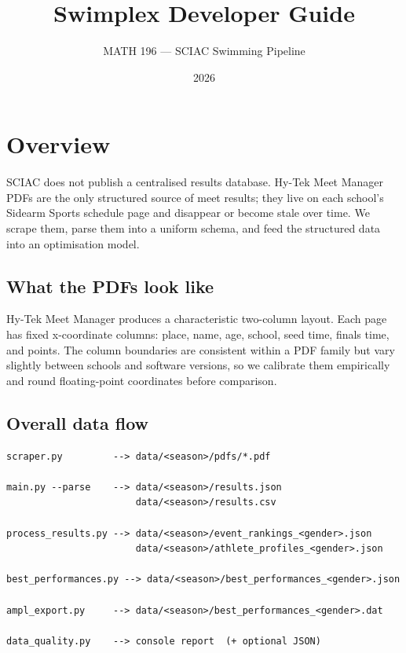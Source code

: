 \documentclass{article}
\title{Swimplex Developer Guide}
\author{MATH 196 --- SCIAC Swimming Pipeline}
\date{2026}
\begin{document}
\maketitle
\tableofcontents
\newpage

\section{Overview}

SCIAC does not publish a centralised results database. Hy-Tek Meet Manager
PDFs are the only structured source of meet results; they live on each school's
Sidearm Sports schedule page and disappear or become stale over time. We scrape
them, parse them into a uniform schema, and feed the structured data into an
optimisation model.

\subsection*{What the PDFs look like}

Hy-Tek Meet Manager produces a characteristic two-column layout. Each page has
fixed x-coordinate columns: place, name, age, school, seed time, finals time,
and points. The column boundaries are consistent within a PDF family but vary
slightly between schools and software versions, so we calibrate them empirically
and round floating-point coordinates before comparison.

\subsection*{Overall data flow}

\begin{lstlisting}
scraper.py         --> data/<season>/pdfs/*.pdf

main.py --parse    --> data/<season>/results.json
                       data/<season>/results.csv

process_results.py --> data/<season>/event_rankings_<gender>.json
                       data/<season>/athlete_profiles_<gender>.json

best_performances.py --> data/<season>/best_performances_<gender>.json

ampl_export.py     --> data/<season>/best_performances_<gender>.dat

data_quality.py    --> console report  (+ optional JSON)
\end{lstlisting}
\end{document}
